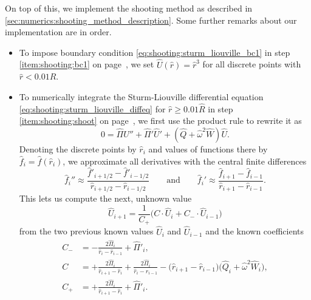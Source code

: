 On top of this, we implement the shooting method as described in \cref{sec:numerics:shooting_method_description}.
Some further remarks about our implementation are in order.
\begin{itemize}
\item To impose boundary condition \eqref{eq:shooting:sturm_liouville_bc1} in step \ref{item:shooting:bc1} on page~\pageref{item:shooting:bc1}, we set $\hat{U}(\hat{r}) = \hat{r}^3$ for all discrete points with $\hat{r} < 0.01 \hat{R}$.
\item To numerically integrate the Sturm-Liouville differential equation \eqref{eq:shooting:sturm_liouville_diffeq} for $\hat{r} \geq 0.01 \hat{R}$ in step \ref{item:shooting:shoot} on page~\pageref{item:shooting:shoot}, we first use the product rule to rewrite it as
      \begin{equation}
	      0 = \hat{\Pi} \hat{U}'' + \hat{\Pi}' \hat{U}' + \left( \hat{Q} + \hat{\omega}^2 \hat{W} \right) \hat{U} .
      \end{equation}
      Denoting the discrete points by $\hat{r}_i$ and values of functions there by $\hat{f}_i = \hat{f}(\hat{r}_i)$, we approximate all derivatives with the central finite differences
      \begin{equation}
          \hat{f}_i'' \approx \frac{\hat{f}'_{i+1/2}-\hat{f}'_{i-1/2}}{\hat{r}_{i+1/2}-\hat{r}_{i-1/2}}
          \qquad \text{and} \qquad
          \hat{f}_i' \approx \frac{\hat{f}_{i+1}-\hat{f}_{i-1}}{\hat{r}_{i+1}-\hat{r}_{i-1}} .
      \end{equation}
      This lets us compute the next, unknown value
      \begin{equation}
            \hat{U}_{i+1} = \frac{1}{C_+} \Big( C \cdot \hat{U}_i + C_- \cdot \hat{U}_{i-1} \Big)
      \end{equation}
      from the two previous known values $\hat{U}_i$ and $\hat{U}_{i-1}$ and the known coefficients
      \begin{subequations}
      \begin{align}
          C_-             &= -\frac{2 \hat{\Pi}_i}{\hat{r}_i-\hat{r}_{i-1}} + \hat{\Pi}'_i , \\
          C_{\phantom{-}} &= +\frac{2 \hat{\Pi}_i}{\hat{r}_{i+1}-\hat{r}_i} + \frac{2 \hat{\Pi}_i}{\hat{r}_i-\hat{r}_{i-1}} - \Big( \hat{r}_{i+1} - \hat{r}_{i-1} \Big) \Big( \hat{Q}_i + \hat{\omega}^2 \hat{W}_i \Big) , \\
          C_+             &= +\frac{2 \hat{\Pi}_i}{\hat{r}_{i+1}-\hat{r}_i} + \hat{\Pi}'_i .
      \end{align}

\end{subequations}
\end{itemize}

